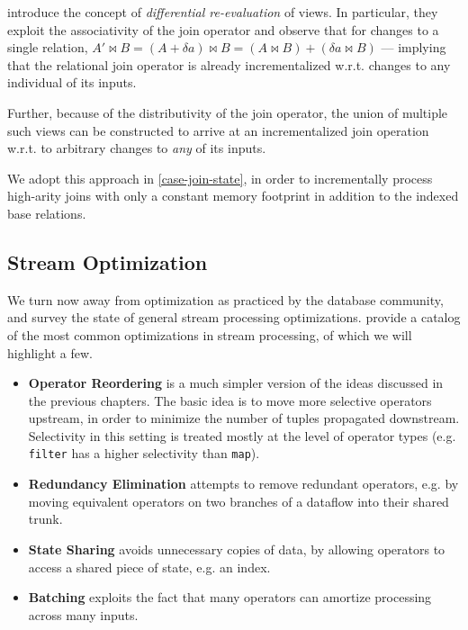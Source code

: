 \documentclass[../index.tex]{subfiles}
\begin{document}
\cite{blakeley1986efficiently} introduce the concept of
\emph{differential re-evaluation} of views. In particular, they
exploit the associativity of the join operator and observe that for
changes to a single relation, $A' \bowtie B = (A + \delta{a}) \bowtie
B = (A \bowtie B) + (\delta{a} \bowtie B)$ — implying that the
relational join operator is already incrementalized w.r.t. changes to
any individual of its inputs.

Further, because of the distributivity of the join operator, the union
of multiple such views can be constructed to arrive at an
incrementalized join operation w.r.t. to arbitrary changes to
\emph{any} of its inputs.

We adopt this approach in \autoref{case-join-state}, in order to
incrementally process high-arity joins with only a constant memory
footprint in addition to the indexed base relations.

\subsection{Stream Optimization}

We turn now away from optimization as practiced by the database
community, and survey the state of general stream processing
optimizations. \cite{hirzel2014catalog} provide a catalog of the most
common optimizations in stream processing, of which we will highlight
a few.

\begin{itemize}
  \item \textbf{Operator Reordering} is a much simpler version of the
    ideas discussed in the previous chapters. The basic idea is to
    move more selective operators upstream, in order to minimize the
    number of tuples propagated downstream. Selectivity in this
    setting is treated mostly at the level of operator types
    (e.g. \texttt{filter} has a higher selectivity than \texttt{map}).

  \item \textbf{Redundancy Elimination} attempts to remove redundant
    operators, e.g. by moving equivalent operators on two branches of
    a dataflow into their shared trunk.

  \item \textbf{State Sharing} avoids unnecessary copies of data, by
    allowing operators to access a shared piece of state, e.g. an
    index.

  \item \textbf{Batching} exploits the fact that many operators can
    amortize processing across many inputs.
\end{itemize}
\end{document}
